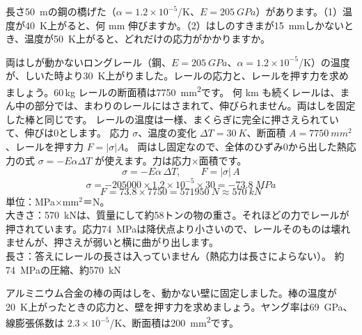 \begin{jibun}
長さ\qty{50}{m}の鋼の橋げた（$\alpha=1.2\times10^{-5}$/K、$E=\qty{205}{GPa}$）があります。（1）温度が\qty{40}{K}上がると、何 mm 伸びますか。（2）はしのすきまが\qty{15}{mm}しかないとき、温度が\qty{50}{K}上がると、どれだけの応力がかかりますか。
\end{jibun}

\begin{phreidai}[ロングレールの熱応力]
\label{ph:力-8:ex5}両はしが動かないロングレール（鋼、$E=\qty{205}{GPa}$、$\alpha=1.2\times10^{-5}$/K）の温度が、しいた時より\qty{30}{K}上がりました。レールの応力と、レールを押す力を求めましょう。60\,kg レールの断面積は\qty{7750}{mm^2}です。
\phbamen
何 km も続くレールは、まん中の部分では、まわりのレールにはさまれて、伸びられません。両はしを固定した棒と同じです。
\phmushi
レールの温度は一様、まくらぎに完全に押さえられていて、伸びは0とします。
\phzu
応力 $\sigma$、温度の変化 $\Delta T=\qty{30}{K}$、断面積 $A=\qty{7750}{mm^2}$、レールを押す力 $F=|\sigma|A$。
\phriyu
両はし固定なので、全体のひずみ0から出した熱応力の式 $\sigma=-E\alpha\Delta T$ が使えます。力は応力×面積です。
\phtateru
\[\sigma=-E\alpha\,\Delta T,\qquad F=|\sigma|\,A\]
\phtoku
\[\sigma=-\num{205000}\times1.2\times10^{-5}\times30=\qty{-73.8}{MPa}\]
\[F=73.8\times7750=\qty{571950}{N}\approx\qty{570}{kN}\]
\phtashikame
単位：MPa×mm$^2$＝N。\\
大きさ：\qty{570}{kN}は、質量にして約58トンの物の重さ。それほどの力でレールが押されています。応力\qty{74}{MPa}は降伏点より小さいので、レールそのものは壊れませんが、押さえが弱いと横に曲がり出します。\\
長さ：答えにレールの長さは入っていません（熱応力は長さによらない）。
\kotae 約\qty{74}{MPa}の圧縮、約\qty{570}{kN}
\end{phreidai}
\begin{jibun}
アルミニウム合金の棒の両はしを、動かない壁に固定しました。棒の温度が\qty{20}{K}上がったときの応力と、壁を押す力を求めましょう。ヤング率は\qty{69}{GPa}、線膨張係数は $2.3\times10^{-5}$/K、断面積は\qty{200}{mm^2}です。
\end{jibun}

